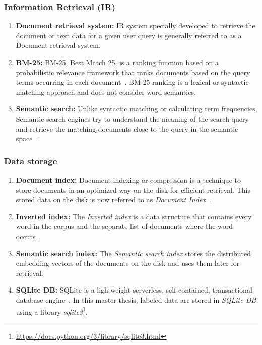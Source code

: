 \documentclass[master,proposal,extern,palatino]{rgseThesis}
\begin{document}
\subsubsection{Information Retrieval (IR)}

\begin{enumerate}
	\item{\textbf{Document retrieval system:}} IR system specially developed to retrieve the document or
	text data for a given user query is generally referred to as a Document retrieval system.
	
	\item{\textbf{BM-25:}} BM-25, Best Match 25, is a ranking function based on a probabilistic
	relevance framework that ranks documents based on the query terms occurring in each
	document~\cite{amati_bm25_2009}. BM-25 ranking is a lexical or syntactic matching approach and does not consider word semantics. 
	
	\item{\textbf{Semantic search:}} Unlike syntactic matching or calculating term frequencies, Semantic
	search engines try to understand the meaning of the search query and retrieve the
	matching documents close to the query in the semantic space~\cite{dong2008survey}.
\end{enumerate}	

\subsubsection{Data storage}

\begin{enumerate}
	\item{\textbf{Document index:}} Document indexing or compression is a technique to store documents in an optimized way on the disk for efficient retrieval. This stored data on the disk is now
	referred to as \textit{Document Index}~\cite{ziviani2000compression}. 
	
	\item{\textbf{Inverted index:}}   The \textit{Inverted index} is a data structure that contains every word in the corpus and the separate list of documents where the word occurs~\cite{ziviani2000compression}. 
	
	\item{\textbf{Semantic search index:}} The \textit{Semantic search index} stores the distributed embedding vectors of the documents on the disk and uses them later for retrieval.
	 
	\item{\textbf{SQLite DB:}} SQLite is a lightweight serverless, self-contained, transactional database engine~\cite{bhosale2015sqlite}. In this master thesis, labeled data are stored in \textit{SQLite DB} using a library \textit{sqlite3}\footnote{\url{https://docs.python.org/3/library/sqlite3.html}}.
	
\end{enumerate}	
\end{document}
